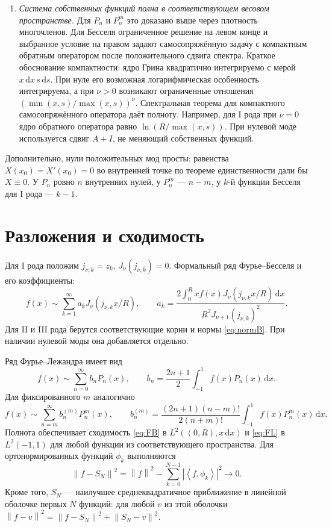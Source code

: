 \documentclass[12pt,a4paper]{article}
\newcommand{\dd}{\,\mathrm{d}}
\newcommand{\norm}[1]{\left\lVert#1\right\rVert}
\newcommand{\ip}[2]{\left\langle#1,#2\right\rangle}
\begin{document}
\begin{enumerate}
\item \emph{Система собственных функций полна в соответствующем весовом пространстве.}
Для $P_n$ и $P_n^m$ это доказано выше через плотность многочленов. Для Бесселя ограниченное решение на левом конце и выбранное условие на правом задают самосопряжённую задачу с компактным обратным оператором после положительного сдвига спектра. Краткое обоснование компактности: ядро Грина квадратично интегрируемо с мерой $x\dd x\,s\dd s$. При нуле его возможная логарифмическая особенность интегрируема, а при $\nu>0$ возникают ограниченные отношения $(\min(x,s)/\max(x,s))^\nu$. Спектральная теорема для компактного самосопряжённого оператора даёт полноту. Например, для I рода при $\nu=0$ ядро обратного оператора равно $\ln(R/\max(x,s))$. При нулевой моде используется сдвиг $A+I$, не меняющий собственных функций.
\end{enumerate}
Дополнительно, нули положительных мод просты: равенства $X(x_0)=X'(x_0)=0$ во внутренней точке по теореме единственности дали бы $X\equiv0$. У $P_n$ ровно $n$ внутренних нулей, у $P_n^m$ --- $n-m$, у $k$-й функции Бесселя для I рода --- $k-1$.

\section{Разложения и сходимость}
Для I рода положим $j_{\nu,k}=z_k$, $J_\nu(j_{\nu,k})=0$. Формальный ряд Фурье--Бесселя и его коэффициенты:
\begin{equation}\label{eq:FB}
f(x)\sim\sum_{k=1}^{\infty}a_kJ_\nu(j_{\nu,k}x/R),\qquad
a_k=\frac{2\int_0^R xf(x)J_\nu(j_{\nu,k}x/R)\dd x}
{R^2J_{\nu+1}(j_{\nu,k})^2}.
\end{equation}
Для II и III рода берутся соответствующие корни и нормы \eqref{eq:normB}. При наличии нулевой моды она добавляется отдельно.

Ряд Фурье--Лежандра имеет вид
\begin{equation}\label{eq:FL}
f(x)\sim\sum_{n=0}^{\infty}b_nP_n(x),\qquad
b_n=\frac{2n+1}{2}\int_{-1}^1 f(x)P_n(x)\dd x.
\end{equation}
Для фиксированного $m$ аналогично
\[
f(x)\sim\sum_{n=m}^{\infty}b_n^{(m)}P_n^m(x),\qquad
b_n^{(m)}=\frac{(2n+1)(n-m)!}{2(n+m)!}
\int_{-1}^1f(x)P_n^m(x)\dd x.
\]
Полнота обеспечивает сходимость \eqref{eq:FB} в $L^2((0,R),x\dd x)$ и \eqref{eq:FL} в $L^2(-1,1)$ для любой функции из соответствующего пространства. Для ортонормированных функций $\phi_k$ выполняются
\begin{equation}\label{eq:parseval}
\norm{f-S_N}^2=\norm f^2-\sum_{k=0}^{N-1}|\ip f{\phi_k}|^2\longrightarrow0.
\end{equation}
Кроме того, $S_N$ --- наилучшее среднеквадратичное приближение в линейной оболочке первых $N$ функций: для любой $v$ из этой оболочки
$\norm{f-v}^2=\norm{f-S_N}^2+\norm{S_N-v}^2$.
\end{document}
